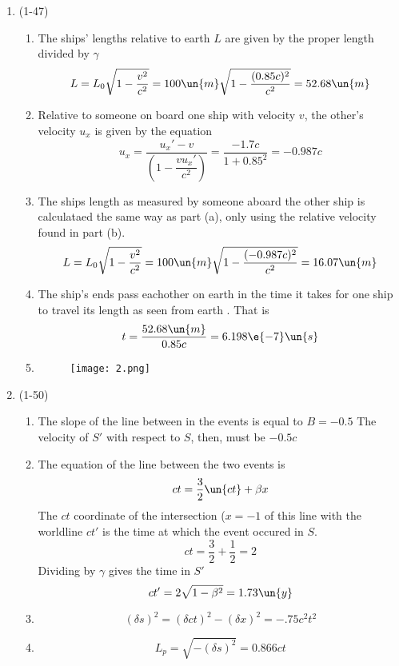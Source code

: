\documentclass{physicsHW}
\begin{document}
\begin{enumerate}
\begin{enumerate}
		\end{enumerate}

		\item (1-47) 
		\begin{enumerate}
			\item The ships' lengths relative to earth $L$ are given by the proper length divided by $\gamma$ 
			\[
				L = L_0 \sqrt{1 - \frac{v^2}{c^2} } = 100\un{m} \sqrt{1 - \frac{(0.85c)^2}{c^2} } = 52.68\un{m} 
			\]

			\item Relative to someone on board one ship with velocity $v$, the other's velocity $u_x$ is given by the equation 
			\[
				u_x = \frac{u_x'-v}{\left( 1 - \dfrac{vu_x'}{c^2} \right)} = \frac{-1.7c}{ 1 + 0.85^2} = -0.987c  
			\]
			\item The ships length as measured by someone aboard the other ship is calculataed the same way as part (a), only using the relative velocity found in part (b). 
			\[
				L = L_0 \sqrt{1 - \frac{v^2}{c^2} } = 100\un{m} \sqrt{1 - \frac{(-0.987c)^2}{c^2} } = 16.07\un{m} 
			\]
			\item The ship's ends pass eachother on earth in the time it takes for one ship to travel its length as seen from earth . That is
			\[
				t = \frac{52.68\un{m}}{0.85c} = 6.198\e{-7}\un{s}
			\]
			\item
			\leavevmode\vadjust{\vspace{-\baselineskip}}\newline
			\begin{figure}[ht!]
			\begin{center}
			    \texttt{[image: 2.png]}
			\end{center}
			\end{figure}



				
		\end{enumerate}


		\item (1-50)
		\begin{enumerate}
			\item The slope of the line between in the events is equal to $B = -0.5$ The velocity of $S'$ with respect to $S$, then, must be $-0.5c$
			\item The equation of the line between the two events is
			\[
				ct = \frac{3}{2} \un{ct} +  \beta x 
			\]
			The $ct$ coordinate of the intersection ($x = -1$ of this line with the worldline $ct'$ is the time at which the event occured in $S$.
			\[
				ct = \frac{3}{2} + \frac{1}{2} = 2
			\]
			Dividing by $\gamma$ gives the time in $S'$
			\[
				ct' = 2\sqrt{1 - \beta^2} =  1.73 \un{y}
			\]
			\item 
			\[
				(\delta s)^2 = (\delta ct)^2 - (\delta x)^2 = -.75c^2t^2
			\]
			\item 
			\[
				L_p = \sqrt{-(\delta s)^2} = 0.866ct
			\]
		

\end{enumerate}
\end{enumerate}
\end{document}
